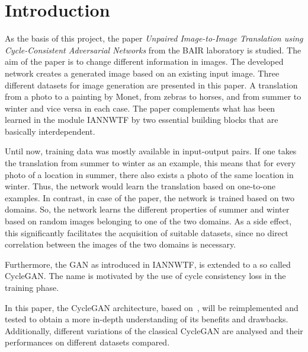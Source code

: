 \documentclass[fleqn,10pt]{SelfArx} %
\begin{document}
\maketitle
\tableofcontents
\thispagestyle{empty} %


\section*{Introduction}
As the basis of this project, the paper \textit{Unpaired Image-to-Image Translation using Cycle-Consistent Adversarial Networks} from the \ac{BAIR} laboratory is studied. The aim of the paper is to change different information in images. The developed network creates a generated image based on an existing input image. Three different datasets for image generation are presented in this paper. A translation from a photo to a painting by Monet, from zebras to horses, and from summer to winter and vice versa in each case. The paper complements what has been learned in the module \ac{IANNWTF} by two essential building blocks that are basically interdependent.~\cite{image-to-image-ccan}

Until now, training data was mostly available in input-output pairs. If one takes the translation from summer to winter as an example, this means that for every photo of a location in summer, there also exists a photo of the same location in winter. Thus, the network would learn the translation based on one-to-one examples. In contrast, in case of the paper, the network is trained based on two domains. So, the network learns the different properties of summer and winter based on random images belonging to one of the two domains. As a side effect, this significantly facilitates the acquisition of suitable datasets, since no direct correlation between the images of the two domains is necessary.~\cite{image-to-image-ccan}

Furthermore, the \ac{GAN} as introduced in \ac{IANNWTF}, is extended to a so called Cycle\ac{GAN}. The name is motivated by the use of cycle consistency loss in the training phase.

In this paper, the Cycle\ac{GAN} architecture, based on~\cite{image-to-image-ccan}, will be reimplemented and tested to obtain a more in-depth understanding of its benefits and drawbacks. Additionally, different variations of the classical Cycle\ac{GAN} are analysed and their performances on different datasets compared.
\end{document}

